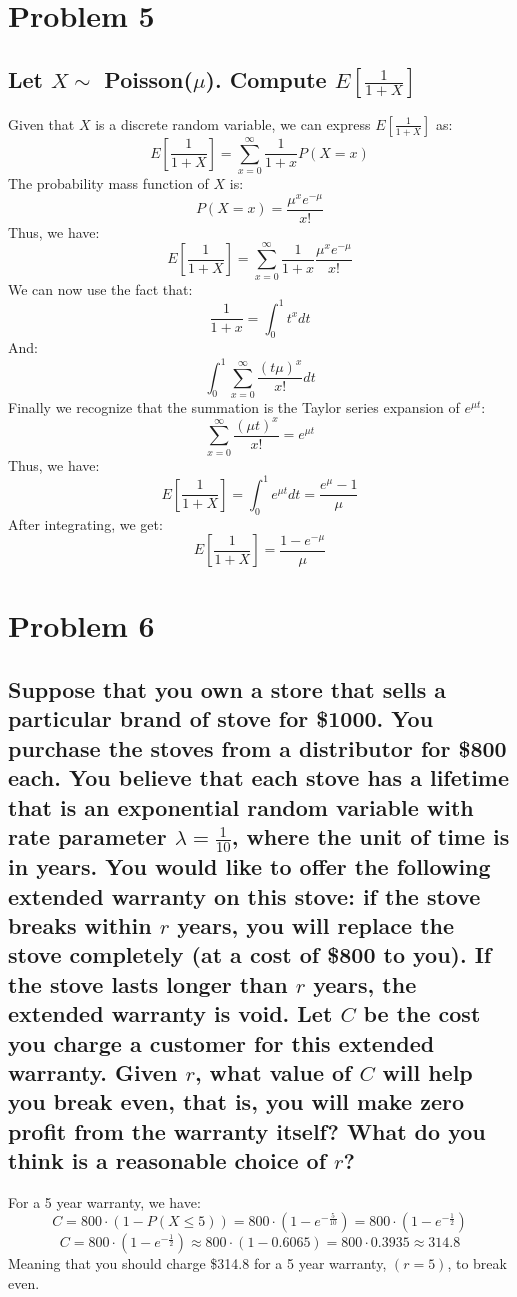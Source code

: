 \documentclass{article}
\theoremstyle{plain} %
\theoremstyle{definition} %
\begin{document}
\section*{Problem 5}
\subsection*{Let $X\sim$ Poisson($\mu$). Compute $E[\frac{1}{1+X}]$}
Given that $X$ is a discrete random variable, we can express $E[\frac{1}{1+X}]$ as:
\[
    E[\frac{1}{1+X}] = \sum_{x=0}^{\infty} \frac{1}{1+x} P(X=x)
\]
The probability mass function of $X$ is:
\[
    P(X=x) = \frac{\mu^x e^{-\mu}}{x!}
\]
Thus, we have:
\[
    E[\frac{1}{1+X}] = \sum_{x=0}^{\infty} \frac{1}{1+x} \frac{\mu^x e^{-\mu}}{x!}
\]
We can now use the fact that:
\[
    \frac{1}{1+x} = \int_{0}^{1} t^x dt
\]
And:
\[
    \int_{0}^{1} \sum_{x=0}^{\infty} \frac{(t\mu)^x}{x!} dt
\]
Finally we recognize that the summation is the Taylor series expansion of $e^{\mu t}$:
\[
    \sum_{x=0}^{\infty} \frac{(\mu t)^x}{x!} = e^{\mu t}
\]
Thus, we have:
\[
    E[\frac{1}{1+X}] = \int_{0}^{1} e^{\mu t} dt = \frac{e^{\mu} - 1}{\mu}
\]
After integrating, we get:
\[
    E[\frac{1}{1+X}] = \boxed{\frac{1-e^{-\mu}}{\mu}}
\]


\section*{Problem 6}
\subsection*{Suppose that you own a store that sells a particular
brand of stove for \$1000. You purchase the stoves from a distributor for \$800 each. You
believe that each stove has a lifetime that is an exponential random variable with rate
parameter $\lambda = \frac{1}{10}$, where the unit of time is in years. You would like to offer the following
extended warranty on this stove: if the stove breaks within $r$ years, you will replace the
stove completely (at a cost of \$800 to you). If the stove lasts longer than $r$ years, the
extended warranty is void. Let $C$ be the cost you charge a customer for this extended
warranty. Given $r$, what value of $C$ will help you break even, that is, you will make zero
profit from the warranty itself? What do you think is a reasonable choice of $r$?}
For a 5 year warranty, we have:
\[
    C = 800 \cdot (1 - P(X \leq 5)) = 800 \cdot (1 - e^{-\frac{5}{10}}) = 800 \cdot (1 - e^{-\frac{1}{2}})
\]
\[
    C = 800 \cdot (1 - e^{-\frac{1}{2}}) \approx 800 \cdot (1 - 0.6065) = 800 \cdot 0.3935 \approx 314.8
\]
Meaning that you should charge \$314.8 for a 5 year warranty, $(r=5)$, to break even.
\end{document}
